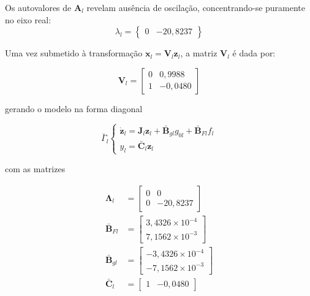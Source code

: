 \documentclass{ppgeesa}
\begin{document}
Os autovalores de $\mathbf{A}_l$ revelam ausência de oscilação, concentrando-se puramente no eixo real:
\begin{equation}
    \lambda_{l} = \begin{Bmatrix}
      0 & -20{,}8237
    \end{Bmatrix}
\end{equation}

Uma vez submetido à transformação $\mathbf{x}_l = \mathbf{V}_l \mathbf{z}_l$, a matriz $\mathbf{V}_l$ é dada por:

\begin{equation}
    \mathbf{V}_l = \begin{bmatrix}
        0 & 0{,}9988 \\
        1 & -0{,}0480
    \end{bmatrix}
\end{equation}

\noindent gerando o modelo na forma diagonal 

\begin{equation}
  \bar{\Gamma}_l
    \begin{cases}
      \dot{\mathbf{z}}_l = \mathbf{J}_l \mathbf{z}_l + \bar{\mathbf{B}}_{gl}g_{0l} + \bar{\mathbf{B}}_{Fl} f_l\\
      y_l = \bar{\mathbf{C}}_l \mathbf{z}_l
  \end{cases}
\end{equation}

\noindent com as matrizes

{\allowdisplaybreaks
\begin{align}
    \mathbf{\Lambda}_l &= \begin{bmatrix}
        0 & 0 \\
        0 & -20{,}8237
    \end{bmatrix} \\
    \bar{\mathbf{B}}_{Fl} &= \begin{bmatrix} 3{,}4326 \times 10^{-4} \\ 7{,}1562 \times 10^{-3} \end{bmatrix} \\
    \bar{\mathbf{B}}_{gl} &= \begin{bmatrix} -3{,}4326 \times 10^{-4} \\ -7{,}1562 \times 10^{-3} \end{bmatrix} \\
    \bar{\mathbf{C}}_l &= \begin{bmatrix} 1 & -0{,}0480 \end{bmatrix}
\end{align}
}
\end{document}
